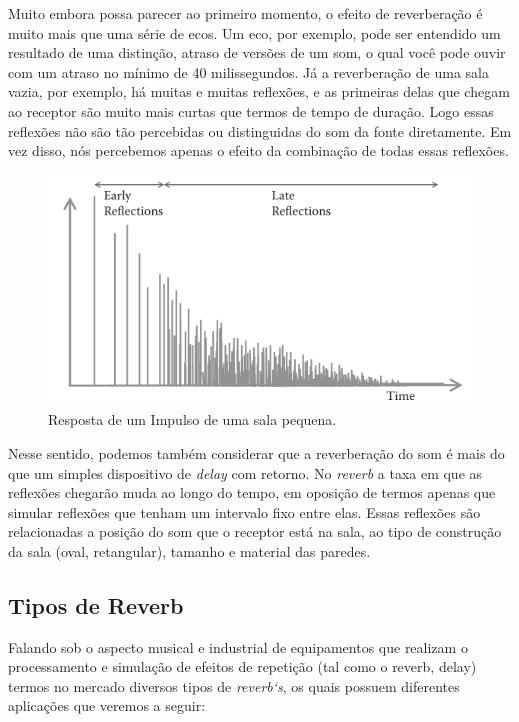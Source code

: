 		Muito embora possa parecer ao primeiro momento, o efeito de reverberação é muito mais que uma série de ecos. Um eco, por exemplo, pode ser entendido um resultado de uma distinção, atraso de versões de um som, o qual você pode ouvir com um atraso no mínimo de 40 milissegundos. Já a reverberação de uma sala vazia, por exemplo, há muitas e muitas reflexões, e as primeiras delas que chegam ao receptor são muito mais curtas que termos de tempo de duração. Logo essas reflexões não são tão percebidas ou distinguidas do som da fonte diretamente. Em vez disso, nós percebemos apenas o efeito da combinação de todas essas reflexões.
		
		\begin{figure}[!h b t]
			\centering
			\includegraphics[scale=0.5]{./figuras/reverb02.png}
			\caption{Resposta de um Impulso de uma sala pequena.}
			\label{reverb02}
		\end{figure}
		
		Nesse sentido, podemos também considerar que a reverberação do som é mais do que um simples dispositivo de \textit{delay} com retorno. No \textit{reverb} a taxa em que as reflexões chegarão muda ao longo do tempo, em oposição de termos apenas que simular reflexões que tenham um intervalo fixo entre elas. Essas reflexões são relacionadas a posição do som que o receptor está na sala, ao tipo de construção da sala (oval, retangular), tamanho e material das paredes. 
		
		
	\subsection{Tipos de Reverb}
	
		Falando sob o aspecto musical e industrial de equipamentos que realizam o processamento e simulação de efeitos de repetição (tal como o reverb, delay) termos no mercado diversos tipos de \textit{reverb`s}, os quais possuem diferentes aplicações que veremos a seguir:
		
